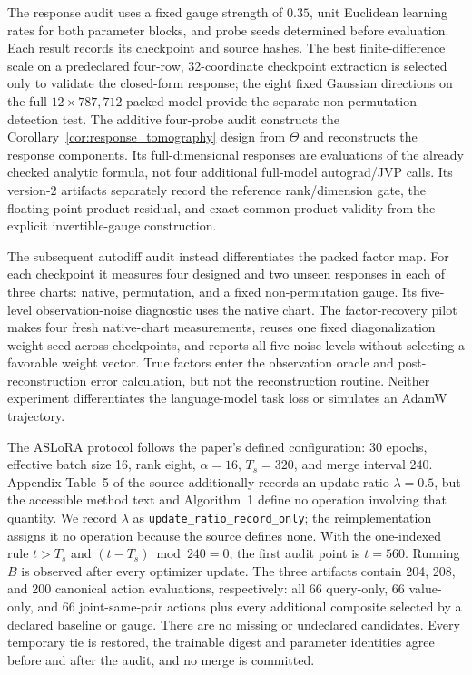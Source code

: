 The response audit uses a fixed gauge strength of $0.35$, unit Euclidean
learning rates for both parameter blocks, and probe seeds determined before
evaluation.  Each result records its checkpoint and source hashes.  The best
finite-difference scale on a predeclared four-row, 32-coordinate checkpoint
extraction is selected only to validate the closed-form response; the eight
fixed Gaussian directions on the full $12\times787{,}712$ packed model provide
the separate non-permutation detection test.  The additive four-probe audit
constructs the Corollary~\ref{cor:response_tomography} design from \(\Theta\)
and reconstructs the response components.  Its full-dimensional responses are
evaluations of the already checked analytic formula, not four additional
full-model autograd/JVP calls.  Its version-2 artifacts separately record the
reference rank/dimension gate, the floating-point product residual, and exact
common-product validity from the explicit invertible-gauge construction.

The subsequent autodiff audit instead differentiates the packed factor map.
For each checkpoint it measures four designed and two unseen responses in
each of three charts: native, permutation, and a fixed non-permutation gauge.
Its five-level observation-noise diagnostic uses the native chart. The
factor-recovery pilot makes four fresh native-chart measurements, reuses one
fixed diagonalization weight seed across checkpoints, and reports all five
noise levels without selecting a favorable weight vector. True factors enter
the observation oracle and post-reconstruction error calculation, but not the
reconstruction routine. Neither experiment differentiates the language-model
task loss or simulates an AdamW trajectory.

The ASLoRA protocol follows the paper's defined configuration: 30 epochs,
effective batch size 16, rank eight, $\alpha=16$, $T_s=320$, and merge interval
240.  Appendix Table~5 of the source additionally records an update ratio
$\lambda=0.5$, but the accessible method text and Algorithm~1 define no
operation involving that quantity.  We record $\lambda$ as \texttt{update\_ratio\_record\_only}; the
reimplementation assigns it no operation because the source defines none.  With the one-indexed rule $t>T_s$ and
$(t-T_s)\bmod 240=0$, the first audit point is $t=560$.  Running $B$ is observed
after every optimizer update.  The three
artifacts contain 204, 208, and 200 canonical action evaluations, respectively:
all 66 query-only, 66 value-only, and 66 joint-same-pair actions plus every
additional composite selected by a declared baseline or gauge.  There are no
missing or undeclared candidates.  Every temporary tie is restored, the
trainable digest and parameter identities agree before and after the audit, and
no merge is committed.

